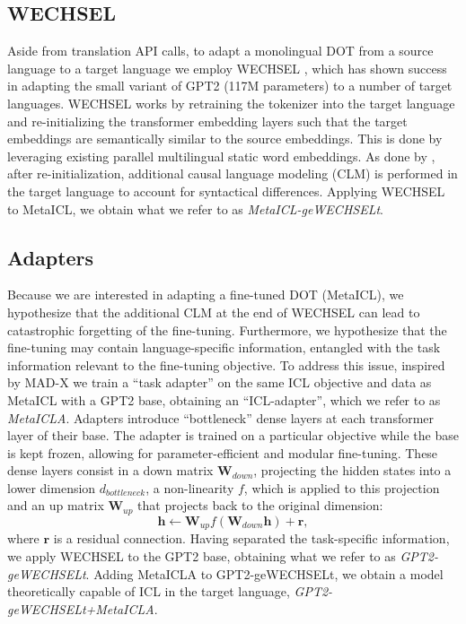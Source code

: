 \documentclass[11pt]{article}
\begin{document}
\subsection{WECHSEL}

Aside from translation API calls, to adapt a monolingual DOT from a source language to a target
language we employ WECHSEL \citep{minixhofer_wechsel_2022}, which has shown success in adapting the
small variant of GPT2 (117M parameters) to a number of target languages. WECHSEL works by retraining
the tokenizer into the target language and re-initializing the transformer embedding layers such
that the target embeddings are semantically similar to the source embeddings. This is done by
leveraging existing parallel multilingual static word embeddings. As done by
\citet{de_vries_adapting_2021}, after re-initialization, additional causal language modeling (CLM)
is performed in the target language to account for syntactical differences. Applying WECHSEL to
MetaICL, we obtain what we refer to as \textit{MetaICL-geWECHSELt}.

\subsection{Adapters}\label{sec:method:adapters}

Because we are interested in adapting a fine-tuned DOT (MetaICL), we hypothesize that the additional
CLM at the end of WECHSEL can lead to catastrophic forgetting of the fine-tuning. Furthermore, we
hypothesize that the fine-tuning may contain language-specific information, entangled with the task
information relevant to the fine-tuning objective. To address this issue, inspired by MAD-X
\citep{pfeiffer_mad-x_2020} we train a ``task adapter'' on the same ICL objective and data as
MetaICL with a GPT2 base, obtaining an ``ICL-adapter'', which we refer to as \textit{MetaICLA}.
Adapters introduce ``bottleneck'' dense layers at each transformer layer of their base. The adapter
is trained on a particular objective while the base is kept frozen, allowing for parameter-efficient
and modular fine-tuning. These dense layers consist in a down matrix $\mathbf{W}_{down}$, projecting
the hidden states into a lower dimension $d_{bottleneck}$, a non-linearity $f$, which is applied to
this projection and an up matrix $\mathbf{W}_{up}$ that projects back to the original dimension:
\begin{equation} \mathbf{h} \leftarrow \mathbf{W}_{up} f(\mathbf{W}_{down} \mathbf{h}) + \mathbf{r},
\end{equation} where $\mathbf{r}$ is a residual connection. Having separated the task-specific
information, we apply WECHSEL to the GPT2 base, obtaining what we refer to as
\textit{GPT2-geWECHSELt}. Adding MetaICLA to GPT2-geWECHSELt, we obtain a model theoretically
capable of ICL in the target language, \textit{GPT2-geWECHSELt+MetaICLA}.
\end{document}
